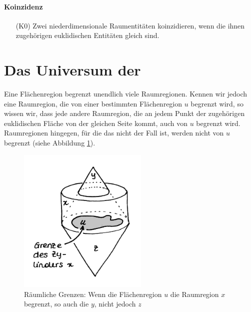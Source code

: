 	\paragraph{Koinzidenz} 
	\begin{itemize}
	    \item[(K0)] Zwei niederdimensionale Raumentitäten koinzidieren, wenn die ihnen zugehörigen euklidischen Entitäten gleich sind.
	\end{itemize}

	
    \section{Das Universum der \strukt}\label{sec:universum}

        Eine Flächenregion begrenzt unendlich viele Raumregionen.
        Kennen wir jedoch eine Raumregion, die von einer bestimmten Flächenregion $u$ begrenzt wird, so wissen wir, dass jede andere Raumregion, die an jedem Punkt der zugehörigen euklidischen Fläche von der gleichen Seite kommt, auch von $u$ begrenzt wird.
        Raumregionen hingegen, für die das nicht der Fall ist, werden nicht von $u$ begrenzt (siehe Abbildung \ref{fig:sb}).

        \begin{figure}[ht]
            \centering
            \includegraphics[height=7cm]{abb/sb.png}
            \caption[Räumliche Grenzen]{Räumliche Grenzen: Wenn die Flächenregion $u$ die Raumregion $x$ begrenzt, so auch die $y$, nicht jedoch $z$}
            \label{fig:sb}
        \end{figure}

